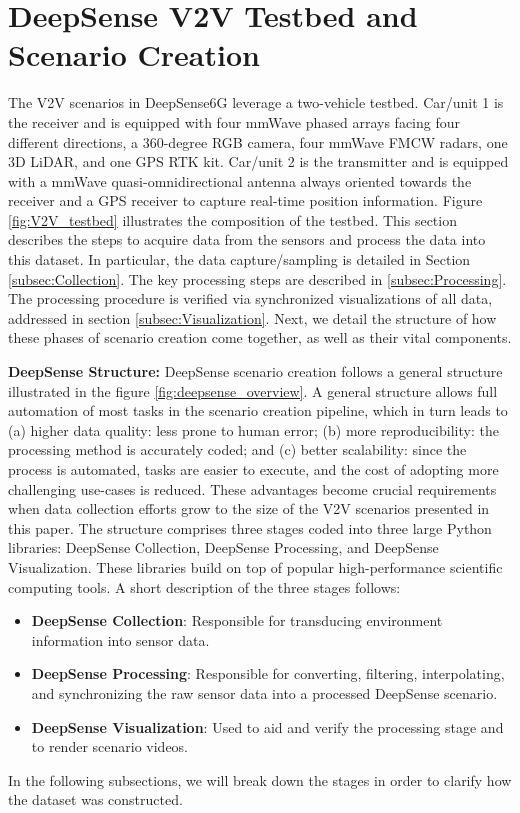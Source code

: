 \documentclass[10pt,comsoc]{IEEEtran}
\begin{document}
\section{DeepSense V2V Testbed and Scenario Creation}

The V2V scenarios in DeepSense6G \cite{DeepSense} leverage a two-vehicle testbed. Car/unit 1 is the receiver and is equipped with four mmWave phased arrays facing four different directions, a 360-degree RGB camera, four mmWave FMCW radars, one 3D LiDAR, and one GPS RTK kit. Car/unit 2 is the transmitter and is equipped with a mmWave quasi-omnidirectional antenna always oriented towards the receiver and a GPS receiver to capture real-time position information. Figure \ref{fig:V2V_testbed} illustrates the composition of the testbed. This section describes the steps to acquire data from the sensors and process the data into this dataset. In particular, the data capture/sampling is detailed in Section \ref{subsec:Collection}. The key processing steps are described in \ref{subsec:Processing}. The processing procedure is verified via synchronized visualizations of all data, addressed in section \ref{subsec:Visualization}. Next, we detail the structure of how these phases of scenario creation come together, as well as their vital components. 

\textbf{DeepSense Structure:} DeepSense scenario creation follows a general structure illustrated in the figure \ref{fig:deepsense_overview}. A general structure allows full automation of most tasks in the scenario creation pipeline, which in turn leads to (a) higher data quality: less prone to human error; (b) more reproducibility: the processing method is accurately coded; and (c) better scalability: since the process is automated, tasks are easier to execute, and the cost of adopting more challenging use-cases is reduced. These advantages become crucial requirements when data collection efforts grow to the size of the V2V scenarios presented in this paper. The structure comprises three stages coded into three large Python libraries: DeepSense Collection, DeepSense Processing, and DeepSense Visualization. These libraries build on top of popular high-performance scientific computing tools. A short description of the three stages follows:
\begin{itemize}
    \item \textbf{DeepSense Collection}: Responsible for transducing environment information into sensor data. 
    \item \textbf{DeepSense Processing}: Responsible for converting, filtering, interpolating, and synchronizing the raw sensor data into a processed DeepSense scenario.
    \item \textbf{DeepSense Visualization}: Used to aid and verify the processing stage and to render scenario videos. 
\end{itemize}
In the following subsections, we will break down the stages in order to clarify how the dataset was constructed.
\end{document}

